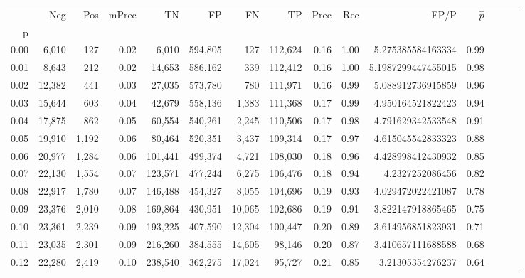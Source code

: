 \begin{tabular}{rrrrrrrrrrrrrrr}
\toprule
{} &     Neg &    Pos & mPrec &       TN &       FP &       FN &       TP &  Prec &   Rec &                  FP/P & $\hat{p}$ \\
p    &         &        &       &          &          &          &          &       &       &                       &           \\
\midrule
0.00 &   6,010 &    127 &  0.02 &    6,010 &  594,805 &      127 &  112,624 &  0.16 &  1.00 &     5.275385584163334 &      0.99 \\
0.01 &   8,643 &    212 &  0.02 &   14,653 &  586,162 &      339 &  112,412 &  0.16 &  1.00 &    5.1987299447455015 &      0.98 \\
0.02 &  12,382 &    441 &  0.03 &   27,035 &  573,780 &      780 &  111,971 &  0.16 &  0.99 &     5.088912736915859 &      0.96 \\
0.03 &  15,644 &    603 &  0.04 &   42,679 &  558,136 &    1,383 &  111,368 &  0.17 &  0.99 &     4.950164521822423 &      0.94 \\
0.04 &  17,875 &    862 &  0.05 &   60,554 &  540,261 &    2,245 &  110,506 &  0.17 &  0.98 &     4.791629342533548 &      0.91 \\
0.05 &  19,910 &  1,192 &  0.06 &   80,464 &  520,351 &    3,437 &  109,314 &  0.17 &  0.97 &     4.615045542833323 &      0.88 \\
0.06 &  20,977 &  1,284 &  0.06 &  101,441 &  499,374 &    4,721 &  108,030 &  0.18 &  0.96 &     4.428998412430932 &      0.85 \\
0.07 &  22,130 &  1,554 &  0.07 &  123,571 &  477,244 &    6,275 &  106,476 &  0.18 &  0.94 &       4.2327252086456 &      0.82 \\
0.08 &  22,917 &  1,780 &  0.07 &  146,488 &  454,327 &    8,055 &  104,696 &  0.19 &  0.93 &     4.029472022421087 &      0.78 \\
0.09 &  23,376 &  2,010 &  0.08 &  169,864 &  430,951 &   10,065 &  102,686 &  0.19 &  0.91 &     3.822147918865465 &      0.75 \\
0.10 &  23,361 &  2,239 &  0.09 &  193,225 &  407,590 &   12,304 &  100,447 &  0.20 &  0.89 &     3.614956851823931 &      0.71 \\
0.11 &  23,035 &  2,301 &  0.09 &  216,260 &  384,555 &   14,605 &   98,146 &  0.20 &  0.87 &     3.410657111688588 &      0.68 \\
0.12 &  22,280 &  2,419 &  0.10 &  238,540 &  362,275 &   17,024 &   95,727 &  0.21 &  0.85 &      3.21305354276237 &      0.64 \\

\end{tabular}
